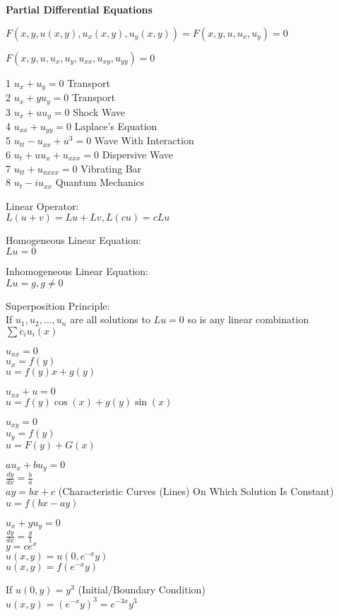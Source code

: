 \Large
\twocolumn

\textbf{Partial Differential Equations}

$F(x,y,u(x,y),u_x (x,y),u_y (x,y))=F(x,y,u,u_x,u_y) = 0$

$F(x,y,u,u_x,u_y,u_{xx},u_{xy},u_{yy}) = 0$

1 $u_x+u_y = 0$ Transport \\
2 $u_x+yu_y = 0$ Transport \\
3 $u_x+u u_y = 0$ Shock Wave \\
4 $u_{xx}+u_{yy} = 0$ Laplace's Equation \\
5 $u_{tt}-u_{xx}+u^3 = 0$ Wave With Interaction \\
6 $u_t+u u_x+u_{xxx} = 0$ Dispersive Wave \\
7 $u_{tt}+u_{xxxx} = 0$ Vibrating Bar \\
8 $u_t-iu_{xx}$ Quantum Mechanics

Linear Operator: \\
$L(u+v)=Lu+Lv, L(cu)=cLu$

Homogeneous Linear Equation: \\
$Lu=0$

Inhomogeneous Linear Equation: \\
$Lu=g, g \neq 0$

Superposition Principle: \\
If $u_1,u_2,\dots,u_n$ are all solutions to $Lu=0$ so is any linear combination $\sum c_i u_i(x)$

$u_{xx}=0$ \\
$u_x=f(y)$ \\
$u=f(y)x+g(y)$

$u_{xx}+u=0$ \\
$u=f(y)\cos(x)+g(y)\sin(x)$

$u_{xy}=0$ \\
$u_y=f(y)$ \\
$u=F(y)+G(x)$

$au_x+bu_y=0$ \\
$\frac{dy}{dx}=\frac{b}{a}$ \\
$ay=bx+c$ (Characteristic Curves (Lines) On Which Solution Is Constant) \\
$u=f(bx-ay)$

$u_x+yu_y=0$ \\
$\frac{dy}{dx}=\frac{y}{1}$ \\
$y=ce^x$ \\
$u(x,y)=u(0,e^{-x} y)$ \\
$u(x,y)=f(e^{-x}y)$

If $u(0,y)=y^3$ (Initial/Boundary Condition) \\
$u(x,y)=(e^{-x}y)^3=e^{-3x}y^3$ \\

